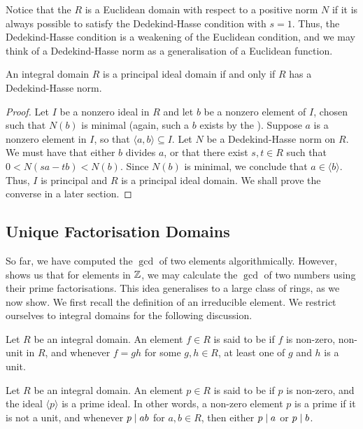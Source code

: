 Notice that the $R$ is a Euclidean domain with respect to a positive norm $N$ if it is always possible to satisfy the Dedekind-Hasse condition with $s=1$. Thus, the Dedekind-Hasse condition is a weakening of the Euclidean condition, and we may think of a Dedekind-Hasse norm as a generalisation of a Euclidean function.

\begin{prop}
    An integral domain $R$ is a principal ideal domain if and only if $R$ has a Dedekind-Hasse norm.
\end{prop}
\begin{proof}
    Let $I$ be a nonzero ideal in $R$ and let $b$ be a nonzero element of $I$, chosen such that $N(b)$ is minimal (again, such a $b$ exists by the ). Suppose $a$ is a nonzero element in $I$, so that $\langle a,b \rangle \subseteq I$. Let $N$ be a Dedekind-Hasse norm on $R$. We must have that either $b$ divides $a$, or that there exist $s,t \in R$ such that $0 < N(sa - tb) < N(b)$. Since $N(b)$ is minimal, we conclude that $a \in \langle b \rangle$. Thus, $I$ is principal and $R$ is a principal ideal domain. We shall prove the converse in a later section.
\end{proof}

\subsection{Unique Factorisation Domains}

So far, we have computed the $\gcd$ of two elements algorithmically. However,  shows us that for elements in $\mathbb{Z}$, we may calculate the $\gcd$ of two numbers using their prime factorisations. This idea generalises to a large class of rings, as we now show. We first recall the definition of an irreducible element. We restrict ourselves to integral domains for the following discussion.

\begin{defn}
    Let $R$ be an integral domain. An element $f \in R$ is said to be  if $f$ is non-zero, non-unit in $R$, and whenever $f = gh$ for some $g,h \in R$, at least one of $g$ and $h$ is a unit.
\end{defn}

\begin{defn}
    Let $R$ be an integral domain. An element $p \in R$ is said to be  if $p$ is non-zero, and the ideal $\langle p \rangle$ is a prime ideal. In other words, a non-zero element $p$ is a prime if it is not a unit, and whenever $p \mid ab$ for $a,b \in R$, then either $p \mid a$ or $p \mid b$.
\end{defn}

